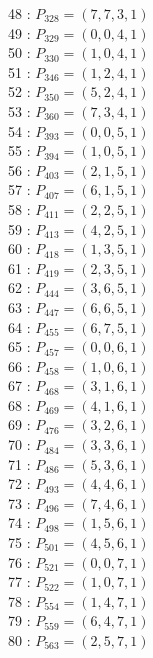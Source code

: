 \documentclass{article}
\begin{document}
{\begin{multicols}{3}
48 : $P_{328}=( 7, 7, 3, 1 )$\\
49 : $P_{329}=( 0, 0, 4, 1 )$\\
50 : $P_{330}=( 1, 0, 4, 1 )$\\
51 : $P_{346}=( 1, 2, 4, 1 )$\\
52 : $P_{350}=( 5, 2, 4, 1 )$\\
53 : $P_{360}=( 7, 3, 4, 1 )$\\
54 : $P_{393}=( 0, 0, 5, 1 )$\\
55 : $P_{394}=( 1, 0, 5, 1 )$\\
56 : $P_{403}=( 2, 1, 5, 1 )$\\
57 : $P_{407}=( 6, 1, 5, 1 )$\\
58 : $P_{411}=( 2, 2, 5, 1 )$\\
59 : $P_{413}=( 4, 2, 5, 1 )$\\
60 : $P_{418}=( 1, 3, 5, 1 )$\\
61 : $P_{419}=( 2, 3, 5, 1 )$\\
62 : $P_{444}=( 3, 6, 5, 1 )$\\
63 : $P_{447}=( 6, 6, 5, 1 )$\\
64 : $P_{455}=( 6, 7, 5, 1 )$\\
65 : $P_{457}=( 0, 0, 6, 1 )$\\
66 : $P_{458}=( 1, 0, 6, 1 )$\\
67 : $P_{468}=( 3, 1, 6, 1 )$\\
68 : $P_{469}=( 4, 1, 6, 1 )$\\
69 : $P_{476}=( 3, 2, 6, 1 )$\\
70 : $P_{484}=( 3, 3, 6, 1 )$\\
71 : $P_{486}=( 5, 3, 6, 1 )$\\
72 : $P_{493}=( 4, 4, 6, 1 )$\\
73 : $P_{496}=( 7, 4, 6, 1 )$\\
74 : $P_{498}=( 1, 5, 6, 1 )$\\
75 : $P_{501}=( 4, 5, 6, 1 )$\\
76 : $P_{521}=( 0, 0, 7, 1 )$\\
77 : $P_{522}=( 1, 0, 7, 1 )$\\
78 : $P_{554}=( 1, 4, 7, 1 )$\\
79 : $P_{559}=( 6, 4, 7, 1 )$\\
80 : $P_{563}=( 2, 5, 7, 1 )$\\
\end{multicols}


%


%


}%
\end{document}
